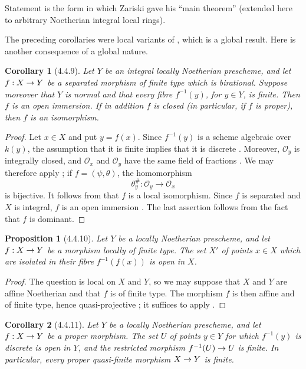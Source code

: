 \documentclass[oneside]{amsart}
\theoremstyle{ega-env-style}
\theoremstyle{ega-thm-env-style}
\newtheorem*{proposition}{Proposition}
\newtheorem*{corollary}{Corollary}
\theoremstyle{ega-defn-env-style}
\def\mathcal{\mathscr}
\def\sh{\mathcal}                   %
\def\kres{k}                        %
\renewcommand{\to}{\mathchoice{\longrightarrow}{\rightarrow}{\rightarrow}{\rightarrow}}
\newcommand{\oldpage}[2][]{{\marginnote{\normalfont{\textbf{#1}~|~#2}}}\ignorespaces}
\let\EGAOriginalLabel\label
\renewcommand{\label}[1]{\phantomsection\EGAOriginalLabel{#1}}
\begin{document}
Statement  is the form in which Zariski gave his
``main theorem'' (extended here to arbitrary Noetherian integral
local rings).

The preceding corollaries were local variants of
, which is a global result.  Here is another
consequence of a global nature.

\begin{corollary}[4.4.9]
\label{III.4.4.9}
Let $Y$ be an integral locally Noetherian prescheme, and let
$f:X\to Y$ be a separated morphism of finite type which is
birational.  Suppose moreover that $Y$ is normal and that every
fibre $f^{-1}(y)$, for $y\in Y$, is finite.  Then $f$ is an open
immersion.  If in addition $f$ is closed (in particular, if $f$ is
proper), then $f$ is an isomorphism.
\end{corollary}

\begin{proof}
Let $x\in X$ and put $y=f(x)$.  Since $f^{-1}(y)$ is a scheme
algebraic over $\kres(y)$, the assumption that it is finite implies
that it is discrete .  Moreover, $\sh{O}_y$ is
integrally closed, and $\sh{O}_x$ and $\sh{O}_y$ have the same field
of fractions .  We may therefore apply
; if $f=(\psi,\theta)$, the homomorphism
\[
  \theta_y^\#:\sh{O}_y\longrightarrow\sh{O}_x
\]
is bijective.  It follows from  that $f$ is a local
isomorphism.  Since $f$ is separated and $X$ is integral, $f$ is an
open immersion .  The last assertion follows from
the fact that $f$ is dominant.
\end{proof}

\begin{proposition}[4.4.10]
\label{III.4.4.10}
Let $Y$ be a locally Noetherian prescheme, and let $f:X\to Y$ be a
morphism locally of finite type.  The set $X'$ of points $x\in X$
which are isolated in their fibre $f^{-1}(f(x))$ is open in $X$.
\end{proposition}

\begin{proof}
The question is local on $X$ and $Y$, so we may suppose that $X$ and
$Y$ are affine Noetherian and that $f$ is of finite type.  The
morphism $f$ is then affine and of finite type, hence quasi-projective
; it suffices to apply .
\end{proof}

\oldpage[III]{138}

\begin{corollary}[4.4.11]
\label{III.4.4.11}
Let $Y$ be a locally Noetherian prescheme, and let $f:X\to Y$ be a
proper morphism.  The set $U$ of points $y\in Y$ for which
$f^{-1}(y)$ is discrete is open in $Y$, and the restricted morphism
$f^{-1}(U)\to U$ is finite.  In particular, every proper
quasi-finite morphism $X\to Y$ is finite.
\end{corollary}
\end{document}

